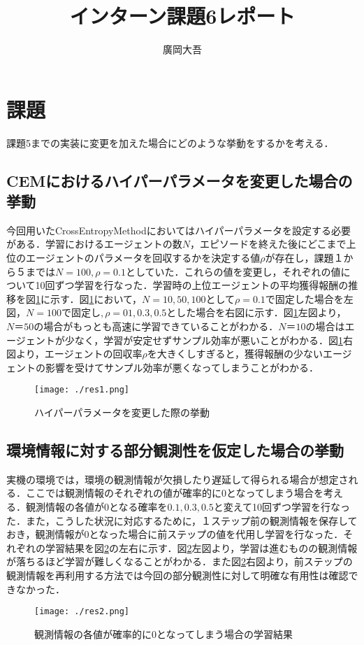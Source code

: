 \documentclass{jsarticle}
\title{\vspace{-4cm}インターン課題6レポート}
\author{廣岡大吾}
\begin{document}
\maketitle
\vspace{-1cm}
\section{課題}
課題5までの実装に変更を加えた場合にどのような挙動をするかを考える．
\subsection{CEMにおけるハイパーパラメータを変更した場合の挙動}
今回用いたCrossEntropyMethodにおいてはハイパーパラメータを設定する必要がある．学習におけるエージェントの数$N$，エピソードを終えた後にどこまで上位のエージェントのパラメータを回収するかを決定する値$\rho$が存在し，課題１から５までは$N = 100, \rho = 0.1$としていた．これらの値を変更し，それぞれの値について10回ずつ学習を行なった．学習時の上位エージェントの平均獲得報酬の推移を図\ref{fig:fig1}に示す．図\ref{fig:fig1}において，$N = 10, 50, 100\text{として}\rho = 0.1$で固定した場合を左図，$N = 100\text{で固定し},\rho = 01, 0.3, 0.5$とした場合を右図に示す．図\ref{fig:fig1}左図より，$N＝50$の場合がもっとも高速に学習できていることがわかる．$N＝10$の場合はエージェントが少なく，学習が安定せずサンプル効率が悪いことがわかる．図\ref{fig:fig1}右図より，エージェントの回収率$\rho$を大きくしすぎると，獲得報酬の少ないエージェントの影響を受けてサンプル効率が悪くなってしまうことがわかる．
\begin{figure}[htbp]
  \begin{center}
    \texttt{[image: ./res1.png]}
    \caption{ハイパーパラメータを変更した際の挙動}
    \label{fig:fig1}
  \end{center}
\end{figure}

    
\subsection{環境情報に対する部分観測性を仮定した場合の挙動}
実機の環境では，環境の観測情報が欠損したり遅延して得られる場合が想定される．ここでは観測情報のそれぞれの値が確率的に0となってしまう場合を考える．観測情報の各値が0となる確率を$0.1, 0.3, 0.5$と変えて10回ずつ学習を行なった．また，こうした状況に対応するために，１ステップ前の観測情報を保存しておき，観測情報が0となった場合に前ステップの値を代用し学習を行なった．それぞれの学習結果を図\ref{fig:fig2}の左右に示す．図\ref{fig:fig2}左図より，学習は進むものの観測情報が落ちるほど学習が難しくなることがわかる．また図\ref{fig:fig2}右図より，前ステップの観測情報を再利用する方法では今回の部分観測性に対して明確な有用性は確認できなかった．
\begin{figure}[htbp]
  \begin{center}
    \texttt{[image: ./res2.png]}
    \caption{観測情報の各値が確率的に0となってしまう場合の学習結果}
    \label{fig:fig2}
  \end{center}
\end{figure}
\end{document}
